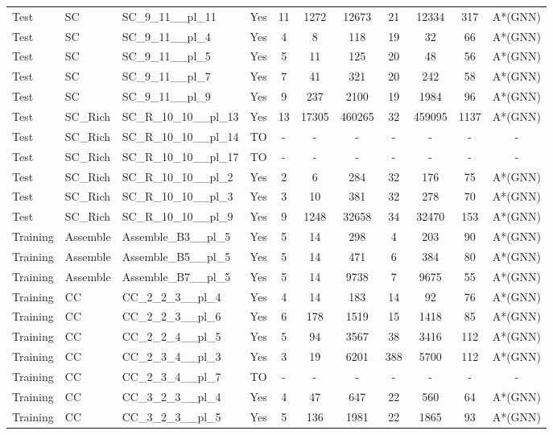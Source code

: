 \documentclass{article}
\begin{document}
\begin{tabular}{lllcccccccc}
Test & SC & SC\_9\_11\_\_pl\_11 & Yes & 11 & 1272 & 12673 & 21 & 12334 & 317 & A*(GNN) \\
Test & SC & SC\_9\_11\_\_pl\_4 & Yes & 4 & 8 & 118 & 19 & 32 & 66 & A*(GNN) \\
Test & SC & SC\_9\_11\_\_pl\_5 & Yes & 5 & 11 & 125 & 20 & 48 & 56 & A*(GNN) \\
Test & SC & SC\_9\_11\_\_pl\_7 & Yes & 7 & 41 & 321 & 20 & 242 & 58 & A*(GNN) \\
Test & SC & SC\_9\_11\_\_pl\_9 & Yes & 9 & 237 & 2100 & 19 & 1984 & 96 & A*(GNN) \\
Test & SC\_Rich & SC\_R\_10\_10\_\_pl\_13 & Yes & 13 & 17305 & 460265 & 32 & 459095 & 1137 & A*(GNN) \\
Test & SC\_Rich & SC\_R\_10\_10\_\_pl\_14 & TO & - & - & - & - & - & - & - \\
Test & SC\_Rich & SC\_R\_10\_10\_\_pl\_17 & TO & - & - & - & - & - & - & - \\
Test & SC\_Rich & SC\_R\_10\_10\_\_pl\_2 & Yes & 2 & 6 & 284 & 32 & 176 & 75 & A*(GNN) \\
Test & SC\_Rich & SC\_R\_10\_10\_\_pl\_3 & Yes & 3 & 10 & 381 & 32 & 278 & 70 & A*(GNN) \\
Test & SC\_Rich & SC\_R\_10\_10\_\_pl\_9 & Yes & 9 & 1248 & 32658 & 34 & 32470 & 153 & A*(GNN) \\
Training & Assemble & Assemble\_B3\_\_pl\_5 & Yes & 5 & 14 & 298 & 4 & 203 & 90 & A*(GNN) \\
Training & Assemble & Assemble\_B5\_\_pl\_5 & Yes & 5 & 14 & 471 & 6 & 384 & 80 & A*(GNN) \\
Training & Assemble & Assemble\_B7\_\_pl\_5 & Yes & 5 & 14 & 9738 & 7 & 9675 & 55 & A*(GNN) \\
Training & CC & CC\_2\_2\_3\_\_pl\_4 & Yes & 4 & 14 & 183 & 14 & 92 & 76 & A*(GNN) \\
Training & CC & CC\_2\_2\_3\_\_pl\_6 & Yes & 6 & 178 & 1519 & 15 & 1418 & 85 & A*(GNN) \\
Training & CC & CC\_2\_2\_4\_\_pl\_5 & Yes & 5 & 94 & 3567 & 38 & 3416 & 112 & A*(GNN) \\
Training & CC & CC\_2\_3\_4\_\_pl\_3 & Yes & 3 & 19 & 6201 & 388 & 5700 & 112 & A*(GNN) \\
Training & CC & CC\_2\_3\_4\_\_pl\_7 & TO & - & - & - & - & - & - & - \\
Training & CC & CC\_3\_2\_3\_\_pl\_4 & Yes & 4 & 47 & 647 & 22 & 560 & 64 & A*(GNN) \\
Training & CC & CC\_3\_2\_3\_\_pl\_5 & Yes & 5 & 136 & 1981 & 22 & 1865 & 93 & A*(GNN) \\

\end{tabular}
\end{document}
